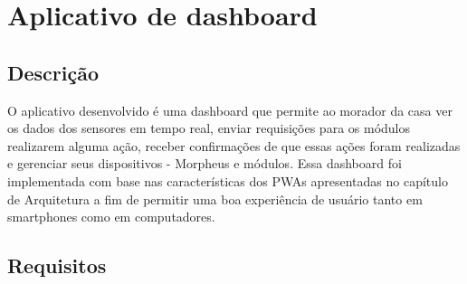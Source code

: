 \section{Aplicativo de dashboard}

\subsection{Descrição}
O aplicativo desenvolvido é uma dashboard que permite ao morador da casa ver os dados dos sensores em tempo real, enviar requisições para os módulos realizarem alguma ação, receber confirmações de que essas ações foram realizadas e gerenciar seus dispositivos - Morpheus e módulos. Essa dashboard foi implementada com base nas características dos PWAs apresentadas no capítulo de Arquitetura a fim de permitir uma boa experiência de usuário tanto em smartphones como em computadores.

\subsection{Requisitos}

